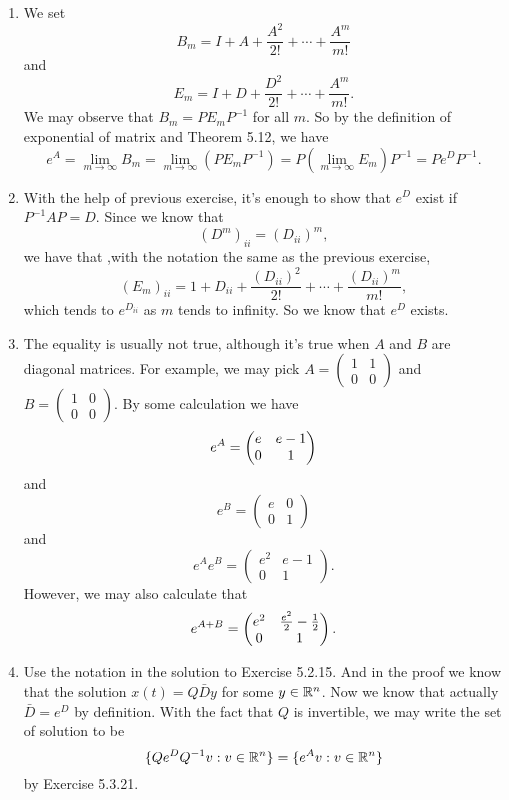 \begin{enumerate}
\item We set 
\[B_m=I+A+\frac{A^2}{2!}+\cdots +\frac{A^m}{m!}\]
and 
\[E_m=I+D+\frac{D^2}{2!}+\cdots +\frac{A^m}{m!}.\]
We may observe that $B_m=PE_mP^{-1}$ for all $m$. So by the definition of exponential of matrix and Theorem 5.12, we have 
\[e^A=\lim_{m\rightarrow \infty}{B_m}=\lim_{m\rightarrow \infty}{(PE_mP^{-1})}=P(\lim_{m\rightarrow \infty}{E_m})P^{-1}=Pe^DP^{-1}.\]
\item With the help of previous exercise, it's enough to show that $e^D$ exist if $P^{-1}AP=D$. Since we know that 
\[(D^m)_{ii}=(D_{ii})^m,\]
we have that ,with the notation the same as the previous exercise,
\[(E_m)_{ii}=1+D_{ii}+\frac{(D_{ii})^2}{2!}+\cdots +\frac{(D_{ii})^m}{m!},\]
which tends to $e^{D_{ii}}$ as $m$ tends to infinity. So we know that $e^D$ exists.
\item The equality is usually not true, although it's true when $A$ and $B$ are diagonal matrices. For example, we may pick $A=\begin{pmatrix}1&1\\0&0\end{pmatrix}$ and $B=\begin{pmatrix}1&0\\0&0\end{pmatrix}$. By some calculation we have 
\[e^A=\begin{pmatrix}e & e-1\cr 0 & 1\end{pmatrix}\]
and 
\[e^B=\begin{pmatrix}e&0\\0&1\end{pmatrix}\]
and 
\[e^Ae^B=\begin{pmatrix}e^2&e-1\\0&1\end{pmatrix}.\]
However, we may also calculate that 
\[e^{A+B}=\begin{pmatrix}{e}^{2} & \frac{{e}^{2}}{2}-\frac{1}{2}\cr 0 & 1\end{pmatrix}.\]
\item Use the notation in the solution to Exercise 5.2.15. And in the proof we know that the solution $x(t)=Q\bar{D}y$ for some $y\in\mathbb{R}^n$. Now we know that actually $\bar{D}=e^D$ by definition. With the fact that $Q$ is invertible, we may write the set of solution to be 
\[\{Qe^DQ^{-1}v:v\in\mathbb{R}^n\}=\{e^Av:v\in\mathbb{R}^n\}\]
by Exercise 5.3.21.
\end{enumerate}